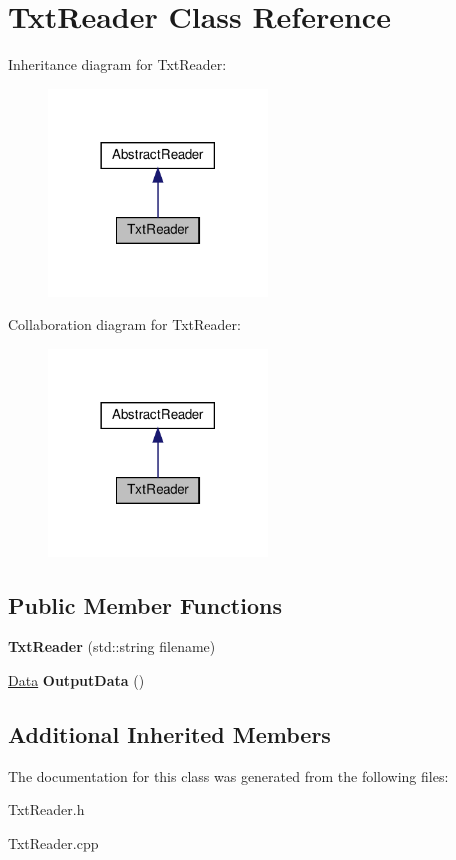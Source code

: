 \hypertarget{classTxtReader}{}\section{Txt\+Reader Class Reference}
\label{classTxtReader}


Inheritance diagram for Txt\+Reader\+:
\nopagebreak
\begin{figure}[H]
\begin{center}
\leavevmode
\includegraphics[width=165pt]{classTxtReader__inherit__graph}
\end{center}
\end{figure}


Collaboration diagram for Txt\+Reader\+:
\nopagebreak
\begin{figure}[H]
\begin{center}
\leavevmode
\includegraphics[width=165pt]{classTxtReader__coll__graph}
\end{center}
\end{figure}
\subsection*{Public Member Functions}
\begin{DoxyCompactItemize}
\item 
\mbox{\label{classTxtReader_acbef0ef9c6034581d76a3b9e305f1508}} 
{\bfseries Txt\+Reader} (std\+::string filename)
\item 
\mbox{\label{classTxtReader_a30786dcd83c2f24dd26e83cb5fd934ab}} 
\hyperlink{structData}{Data} {\bfseries Output\+Data} ()
\end{DoxyCompactItemize}
\subsection*{Additional Inherited Members}


The documentation for this class was generated from the following files\+:\begin{DoxyCompactItemize}
\item 
Txt\+Reader.\+h\item 
Txt\+Reader.\+cpp\end{DoxyCompactItemize}
